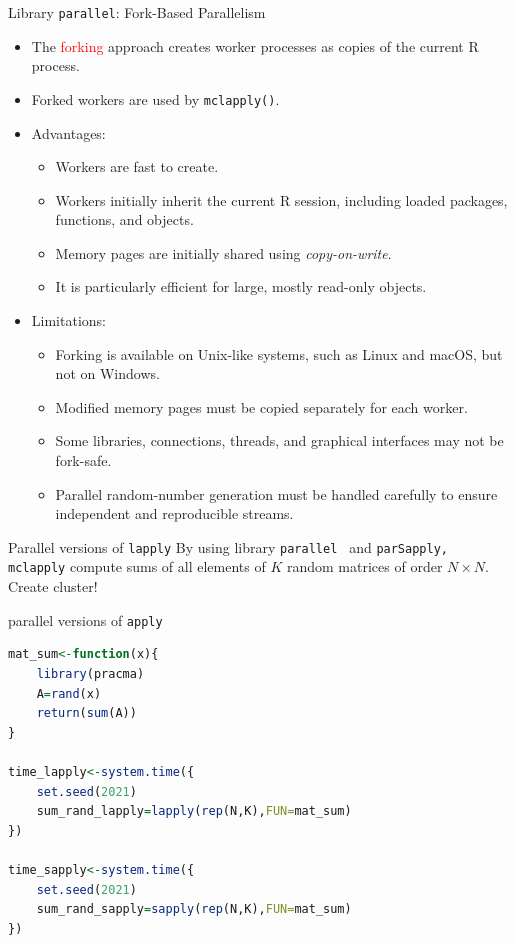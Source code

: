 \documentclass[compress,xcolor=table]{beamer}
\newcommand{\CoG}{\textcolor{red}}
\newcommand{\pp}{\pause}
\begin{document}
\begin{frame}{Library \texttt{parallel}: Fork-Based Parallelism} 
	\footnotesize
	\begin{itemize} 
		\item The \CoG{forking} approach creates worker processes as copies of the current R process.  
		\item Forked workers are used by \texttt{mclapply()}. \pp
		\item Advantages: 
		\begin{itemize} 
			\item Workers are fast to create. 
			\item Workers initially inherit the current R session, including loaded packages, functions, and objects. 
			\item Memory pages are initially shared using \emph{copy-on-write}. 
			\item It is particularly efficient for large, mostly read-only objects. 
			\end{itemize} \pp \item Limitations: 
			\begin{itemize} \item Forking is available on Unix-like systems, such as Linux and macOS, but not on Windows. 
				\item Modified memory pages must be copied separately for each worker. 
				\item Some libraries, connections, threads, and graphical interfaces may not be fork-safe. 
				\item Parallel random-number generation must be handled carefully to ensure independent and reproducible streams. 
			\end{itemize} 
		\end{itemize} 
	\end{frame}

\begin{frame}[fragile]{ Parallel versions of {\tt lapply}}
By using library {\tt parallel } and {\tt parSapply, mclapply}	compute sums of all elements of $K$ random matrices of order  $N\times N$. Create cluster!
\begin{block}{ parallel versions of {\tt apply}}\tiny
	\begin{lstlisting}[basicstyle=\color{blue}\tiny\ttfamily,language=R,escapeinside=`']
mat_sum<-function(x){
	library(pracma)
	A=rand(x)
	return(sum(A))
}

time_lapply<-system.time({
	set.seed(2021)
	sum_rand_lapply=lapply(rep(N,K),FUN=mat_sum)
})

time_sapply<-system.time({
	set.seed(2021)
	sum_rand_sapply=sapply(rep(N,K),FUN=mat_sum)
})
		
	\end{lstlisting}
\end{block}
\end{frame}
\end{document}
